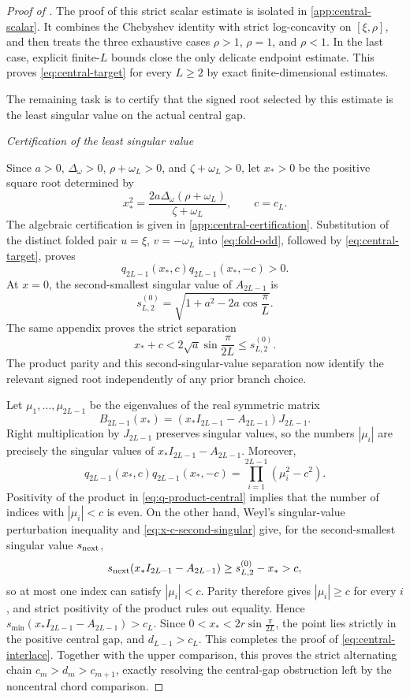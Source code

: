 \documentclass[12pt,anonymous]{iopjournal}
\numberwithin{equation}{section}
\theoremstyle{remark}
\newcommand{\proofstage}[1]{%
  \par\medskip\noindent\textit{#1}\par\nobreak\smallskip}
\begin{document}
\begin{proof}[Proof of ]
The proof of this strict scalar estimate is isolated in
\cref{app:central-scalar}.  It combines the Chebyshev identity with strict
log-concavity on \([\xi,\rho]\), and then treats the three exhaustive cases
\(\rho>1\), \(\rho=1\), and \(\rho<1\).  In the last case, explicit
finite-\(L\) bounds close the only delicate endpoint estimate.  This proves
\eqref{eq:central-target} for every \(L\geq2\) by exact finite-dimensional
estimates.

The remaining task is to certify that the signed root selected by this
estimate is the least singular value on the actual central gap.

\proofstage{Certification of the least singular value}
Since \(a>0\), \(\Delta_\omega>0\), \(\rho+\omega_L>0\), and
\(\zeta+\omega_L>0\), let \(x_*>0\) be the positive square root determined
by
\begin{equation}\label{eq:x-star-central}
 x_*^2=\frac{2a\Delta_\omega(\rho+\omega_L)}{\zeta+\omega_L},
 \qquad c=c_L.
\end{equation}
The algebraic certification is given in
\cref{app:central-certification}.  Substitution of the distinct folded pair
\(u=\xi\), \(v=-\omega_L\) into \eqref{eq:fold-odd}, followed by
\eqref{eq:central-target}, proves
\begin{equation}\label{eq:q-product-central}
 q_{2L-1}(x_*,c)q_{2L-1}(x_*,-c)>0.
\end{equation}
At \(x=0\), the second-smallest singular value of \(A_{2L-1}\) is
\[
 s_{L,2}^{(0)}
 =\sqrt{1+a^2-2a\cos\frac{\pi}{L}}.
\]
The same appendix proves the strict separation
\begin{equation}\label{eq:x-c-second-singular}
 x_*+c<2\sqrt a\sin\frac{\pi}{2L}\leq s_{L,2}^{(0)}.
\end{equation}
The product parity and this second-singular-value separation now identify
the relevant signed root independently of any prior branch choice.

Let \(\mu_1,\ldots,\mu_{2L-1}\) be the eigenvalues of the real symmetric
matrix
\[
 B_{2L-1}(x_*)=(x_*I_{2L-1}-A_{2L-1})J_{2L-1}.
\]
Right multiplication by \(J_{2L-1}\) preserves singular values, so the
numbers \(|\mu_i|\) are precisely the singular values of
\(x_*I_{2L-1}-A_{2L-1}\).  Moreover,
\[
 q_{2L-1}(x_*,c)q_{2L-1}(x_*,-c)
 =\prod_{i=1}^{2L-1}(\mu_i^2-c^2).
\]
Positivity of the product in \eqref{eq:q-product-central} implies that the
number of indices with \(|\mu_i|<c\) is even.  On the other hand, Weyl's
singular-value perturbation inequality and
\eqref{eq:x-c-second-singular} give, for the second-smallest singular value
\(s_{\rm next}\),
\[
 s_{\rm next}(x_*I_{2L-1}-A_{2L-1})
 \geq s_{L,2}^{(0)}-x_*>c,
\]
so at most one index can satisfy \(|\mu_i|<c\).  Parity therefore gives
\(|\mu_i|\geq c\) for every \(i\), and strict positivity of the product
rules out equality.  Hence
\(s_{\min}(x_*I_{2L-1}-A_{2L-1})>c_L\).  Since
\(0<x_*<2r\sin\frac{\pi}{2L}\), the point lies strictly in the positive
central gap, and \(d_{L-1}>c_L\).  This completes the proof of
\eqref{eq:central-interlace}.
Together with the upper comparison, this proves the strict alternating
chain \(c_m>d_m>c_{m+1}\), exactly resolving the central-gap obstruction
left by the noncentral chord comparison.


\end{proof}
\end{document}
